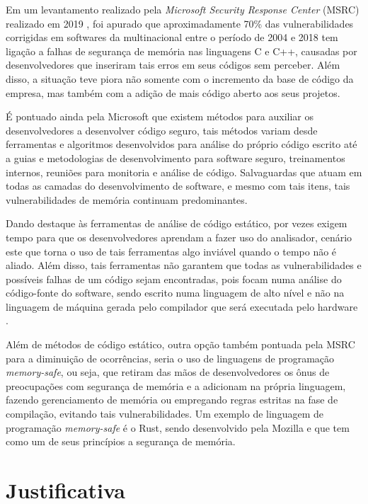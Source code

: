 \documentclass[
    12pt,                %
    openright,           %
    oneside,             %
    a4paper,             %
    english,             %
    brazil               %
]{abntex2}
\begin{document}
Em um levantamento realizado pela \textit{Microsoft Security Response Center} (MSRC) realizado em 2019 \cite{MSRC2019},
foi apurado que aproximadamente 70\% das vulnerabilidades corrigidas em softwares da multinacional entre o período de 2004 e 2018 
tem ligação a falhas de segurança de memória nas linguagens C e C++, causadas por desenvolvedores que inseriram tais erros em seus códigos
sem perceber. Além disso, a situação teve piora não somente com o incremento da base de código da empresa, mas também com a adição de mais 
código aberto aos seus projetos.
\par
É pontuado ainda pela Microsoft que existem métodos para auxiliar os desenvolvedores a desenvolver código seguro, 
tais métodos variam desde ferramentas e algoritmos desenvolvidos para análise do próprio código escrito até a guias e metodologias de desenvolvimento para software seguro, 
treinamentos internos, reuniões para monitoria e análise de código. Salvaguardas que atuam em todas as camadas do desenvolvimento de software, 
e mesmo com tais itens, tais vulnerabilidades de memória continuam predominantes.
\par
Dando destaque às ferramentas de análise de código estático, por vezes exigem tempo para que os desenvolvedores aprendam a fazer uso do analisador, 
cenário este que torna o uso de tais ferramentas algo inviável quando o tempo não é aliado. Além disso, tais ferramentas não garantem que todas 
as vulnerabilidades e possíveis falhas de um código sejam encontradas, pois focam numa análise do código-fonte do software, sendo escrito numa linguagem de alto nível e 
não na linguagem de máquina gerada pelo compilador que será executada pelo hardware \cite{Balakrishnan2010}.
\par
Além de métodos de código estático, outra opção também pontuada pela MSRC para a diminuição de ocorrências, seria o uso de linguagens de programação \textit{memory-safe}, ou seja,
que retiram das mãos de desenvolvedores os ônus de preocupações com segurança de memória e a adicionam na própria linguagem, 
fazendo gerenciamento de memória ou empregando regras estritas na fase de compilação, evitando tais vulnerabilidades.
Um exemplo de linguagem de programação \textit{memory-safe} é o Rust, sendo desenvolvido pela Mozilla e que tem como um de seus princípios a segurança de memória.

\section{Justificativa}
\label{sec:Justificativa}
\end{document}
